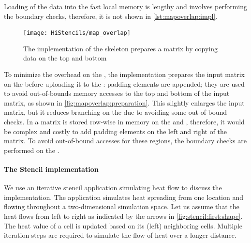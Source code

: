Loading of the data into the fast local memory is lengthy and involves performing the boundary checks, therefore, it is not shown in \autoref{lst:mapoverlap:impl}.
%
\begin{figure}
  \begin{centering}
    \texttt{[image: HiStencils/map\_overlap]}
    \caption[The  implementation of the \stencil skeleton]{The  implementation of the \stencil skeleton prepares a matrix by copying data on the top and bottom}
    \label{fig:mapoverlap:preparation}
    \vspace{-.5em}
  \end{centering}
\end{figure}
%
To minimize the overhead on the \GPU, the  implementation prepares the input matrix on the \CPU before uploading it to the \GPU:
padding elements are appended; they are used to avoid out-of-bounds memory accesses to the top and bottom of the input matrix, as shown in \autoref{fig:mapoverlap:preparation}.
This slightly enlarges the input matrix, but it reduces branching on the \GPU due to avoiding some out-of-bound checks.
In \SkelCL a matrix is stored row-wise in memory on the \CPU and \GPU, therefore, it would be complex and costly to add padding elements on the left and right of the matrix.
To avoid out-of-bound accesses for these regions, the boundary checks are performed on the \GPU.

\paragraph{The Stencil implementation}

We use an iterative stencil application simulating heat flow to discuss the  implementation.
The application simulates heat spreading from one location and flowing throughout a two-dimensional simulation space.
Let us assume that the heat flows from left to right as indicated by the arrows in \autoref{fig:stencil:first:shape}.
The heat value of a cell is updated based on its (left) neighboring cells.
Multiple iteration steps are required to simulate the flow of heat over a longer distance.

